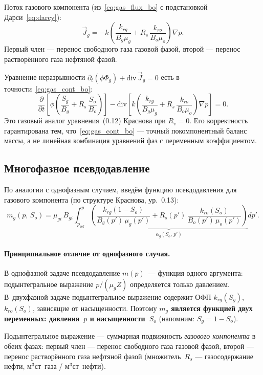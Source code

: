 ﻿\documentclass[12pt,a4paper]{article}
\begin{document}
Поток газового компонента (из~\eqref{eq:gas_flux_bo}
с подстановкой Дарси~\eqref{eq:darcy}):
\[
  \vec{J}_g = -k\left(\frac{k_{rg}}{B_g\mu_g}
  + R_s\,\frac{k_{ro}}{B_o\mu_o}\right)\nabla p.
\]
Первый член --- перенос свободного газа газовой фазой,
второй --- перенос растворённого газа нефтяной фазой.

Уравнение неразрывности
$\partial_t(\phi\Phi_g) + \mathrm{div}\,\vec{J}_g = 0$
есть в точности~\eqref{eq:gas_cont_bo}:
\begin{equation}\label{eq:total_pde}
  \boxed{\frac{\partial}{\partial t}\left[\phi\left(\frac{S_g}{B_g}
  + R_s\,\frac{S_o}{B_o}\right)\right]
  - \mathrm{div}\left[k\left(\frac{k_{rg}}{B_g\mu_g}
  + R_s\,\frac{k_{ro}}{B_o\mu_o}\right)\nabla p\right] = 0.}
\end{equation}
Это газовый аналог уравнения~(0.12) Краснова при $R_v = 0$.
Его корректность гарантирована тем, что~\eqref{eq:gas_cont_bo}
--- точный покомпонентный баланс массы, а не линейная комбинация
уравнений фаз с переменным коэффициентом.

\subsection{Многофазное псевдодавление}\label{ssec:multi_mp}

По аналогии с однофазным случаем, введём функцию псевдодавления
для газового компонента (по структуре Краснова, ур.~0.13):
\begin{equation}\label{eq:mo_def}
  \boxed{m_g(p,\,S_o) = \mu_{gi}\,B_{gi}\int_{p_{\mathrm{ref}}}^{p}
  \underbrace{\left(\frac{k_{rg}(1 - S_o)}{B_g(p')\,\mu_g(p')}
  + R_s(p')\,\frac{k_{ro}(S_o)}{B_o(p')\,\mu_o(p')}\right)}_{\displaystyle
    \alpha_g(S_o,\,p')}dp'.}
\end{equation}

\paragraph{Принципиальное отличие от однофазного случая.}
В однофазной задаче псевдодавление $m(p)$~--- функция одного
аргумента: подынтегральное выражение $p/(\mu_g Z)$ определяется
только давлением. В~двухфазной задаче подынтегральное выражение
содержит ОФП $k_{rg}(S_g)$, $k_{ro}(S_o)$, зависящие от
насыщенности. Поэтому \textbf{$m_g$ является функцией
двух переменных: давления~$p$ и насыщенности~$S_o$}
(напомним: $S_g = 1 - S_o$).

Подынтегральное выражение --- суммарная подвижность
\emph{газового компонента} в обеих фазах: первый член
--- перенос свободного газа газовой фазой, второй
--- перенос растворённого газа нефтяной фазой
(множитель~$R_s$ --- газосодержание нефти, м$^3$ст~газа /
м$^3$ст~нефти).
\end{document}
